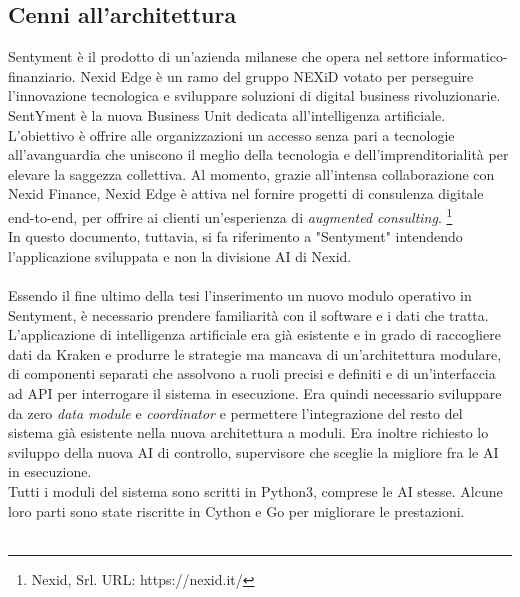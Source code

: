 \documentclass[a4paper,12pt]{report}
\begin{document}
\subsection{Cenni all'architettura}
Sentyment è il prodotto di un'azienda milanese che opera nel settore informatico-finanziario. Nexid Edge è un ramo del gruppo NEXiD votato per perseguire l'innovazione tecnologica e sviluppare soluzioni di digital business rivoluzionarie. SentYment è la nuova Business Unit dedicata all'intelligenza artificiale.\\
L'obiettivo è offrire alle organizzazioni un accesso senza pari a tecnologie all'avanguardia che uniscono il meglio della tecnologia e dell'imprenditorialità per elevare la saggezza collettiva. Al momento, grazie all'intensa collaborazione con Nexid Finance, Nexid Edge è attiva nel fornire progetti di consulenza digitale end-to-end, per offrire ai clienti un'esperienza di \textit{augmented consulting}. \footnote{Nexid, Srl. URL: https://nexid.it/}\\
In questo documento, tuttavia, si fa riferimento a "Sentyment" intendendo l'applicazione sviluppata e non la divisione AI di Nexid.
\\~\\
Essendo il fine ultimo della tesi l'inserimento un nuovo modulo operativo in Sentyment, è necessario prendere familiarità con il software e i dati che tratta.\\
L'applicazione di intelligenza artificiale era già esistente e in grado di raccogliere dati da Kraken e produrre le strategie ma mancava di un'architettura modulare, di componenti separati che assolvono a ruoli precisi e definiti e di un'interfaccia ad API per interrogare il sistema in esecuzione. Era quindi necessario sviluppare da zero \textit{data module} e \textit{coordinator} e permettere l'integrazione del resto del sistema già esistente nella nuova architettura a moduli. Era inoltre richiesto lo sviluppo della nuova AI di controllo, supervisore che sceglie la migliore fra le AI in esecuzione.\\
Tutti i moduli del sistema sono scritti in Python3, comprese le AI stesse. Alcune loro parti sono state riscritte in Cython e Go per migliorare le prestazioni.
\\~\\
\end{document}
